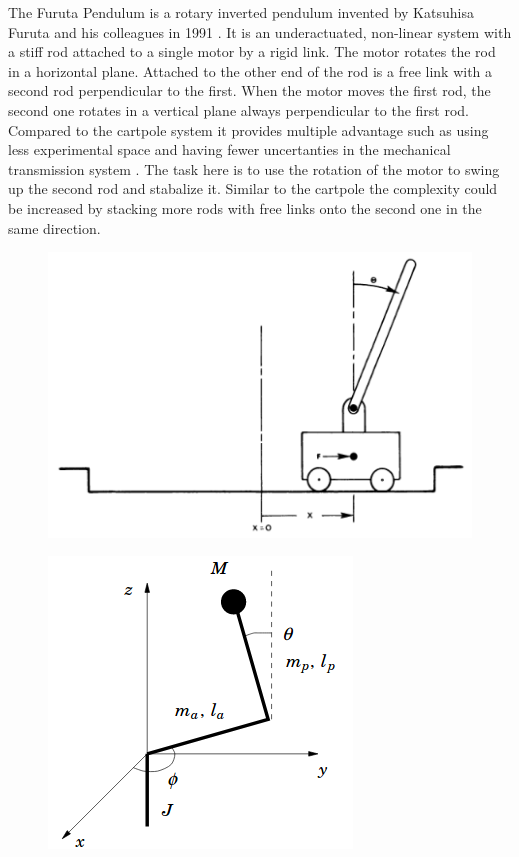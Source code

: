 The Furuta Pendulum is a rotary inverted pendulum invented by Katsuhisa Furuta and his colleagues in 1991 \cite{Furuta1991}. It is an underactuated, non-linear system with a stiff rod attached to a single motor by a rigid link. The motor rotates the rod in a horizontal plane. Attached to the other end of the rod is a free link with a second rod perpendicular to the first. When the motor moves the first rod, the second one rotates in a vertical plane always perpendicular to the first rod. Compared to the cartpole system it provides multiple advantage such as using less experimental space and having fewer uncertanties in the mechanical transmission system \cite{Furuta1991}. The task here is to use the rotation of the motor to swing up the second rod and stabalize it. Similar to the cartpole the complexity could be increased by stacking more rods with free links onto the second one in the same direction.
\begin{figure}
  \begin{minipage}{.5\textwidth}
    \centering
    \includegraphics[scale=.3]{plots/Cartpole_model}
    \label{fig:cartpole}
  \end{minipage}
  \begin{minipage}{.5\textwidth}
    \centering
    \includegraphics[scale=.3]{plots/Furuta_model}
    \label{fig:furuta}
  \end{minipage}
\end{figure}
